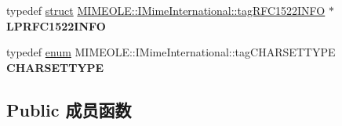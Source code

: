 \begin{DoxyCompactItemize}
typedef \hyperlink{interfacestruct}{struct} \hyperlink{struct_m_i_m_e_o_l_e_1_1_i_mime_international_1_1tag_r_f_c1522_i_n_f_o}{M\+I\+M\+E\+O\+L\+E\+::\+I\+Mime\+International\+::tag\+R\+F\+C1522\+I\+N\+FO} $\ast$ {\bfseries L\+P\+R\+F\+C1522\+I\+N\+FO}
\item 
\mbox{\label{interface_m_i_m_e_o_l_e_1_1_i_mime_international_a9513c393ddb85de73dec14708c5a2806}} 
typedef \hyperlink{interfaceenum}{enum} M\+I\+M\+E\+O\+L\+E\+::\+I\+Mime\+International\+::tag\+C\+H\+A\+R\+S\+E\+T\+T\+Y\+PE {\bfseries C\+H\+A\+R\+S\+E\+T\+T\+Y\+PE}
\end{DoxyCompactItemize}
\subsection*{Public 成员函数}
